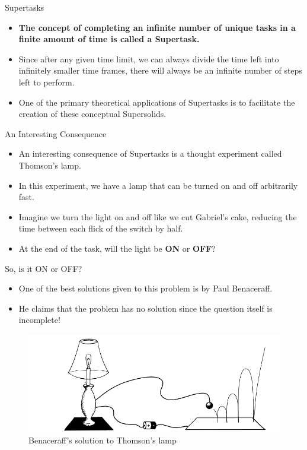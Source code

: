 \documentclass{beamer}
\begin{document}
\begin{frame}{Supertasks}
    \begin{itemize}
        \item \textbf{The concept of completing an infinite number of unique tasks in a finite amount of time is called a Supertask.}
        \item Since after any given time limit, we can always divide the time left into infinitely smaller time frames, there will always be an infinite number of steps left to perform.
        \item One of the primary theoretical applications of Supertasks is to facilitate the creation of these conceptual Supersolids.
    \end{itemize}
\end{frame}

\begin{frame}{An Interesting Consequence}
    \begin{itemize}
        \item An interesting consequence of Supertasks is a thought experiment called Thomson's lamp.
        \item In this experiment, we have a lamp that can be turned on and off arbitrarily fast.
        \item Imagine we turn the light on and off like we cut Gabriel's cake, reducing the time between each flick of the switch by half.
        \item At the end of the task, will the light be \textbf{ON} or \textbf{OFF}?
    \end{itemize}
\end{frame}

\begin{frame}{So, is it ON or OFF?}
    \begin{itemize}
        \item One of the best solutions given to this problem is by Paul Benaceraff.
        \item He claims that the problem has no solution since the question itself is incomplete!
    \end{itemize}
    
    \begin{figure}
        \centering
        \includegraphics[width=\textwidth]{lamp.PNG}
        \caption{Benaceraff's solution to Thomson's lamp}
        \label{fig:my_label}
    \end{figure}
\end{frame}
\end{document}
